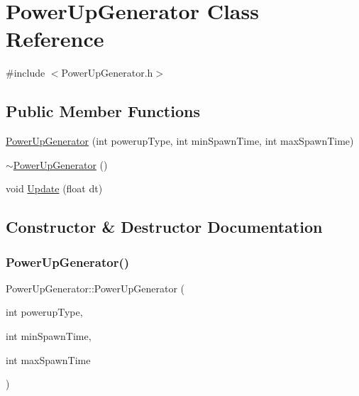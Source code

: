 \hypertarget{class_power_up_generator}{}\section{Power\+Up\+Generator Class Reference}
\label{class_power_up_generator}


{\ttfamily \#include $<$Power\+Up\+Generator.\+h$>$}

\subsection*{Public Member Functions}
\begin{DoxyCompactItemize}
\item 
\hyperlink{class_power_up_generator_af9e9b949330dd6ef6decc758f897454e}{Power\+Up\+Generator} (int powerup\+Type, int min\+Spawn\+Time, int max\+Spawn\+Time)
\item 
\hyperlink{class_power_up_generator_ae2cd842e45e73e0756b93a027ac03207}{$\sim$\+Power\+Up\+Generator} ()
\item 
void \hyperlink{class_power_up_generator_a49002c37923219a8289739b7432e187d}{Update} (float dt)
\end{DoxyCompactItemize}


\subsection{Constructor \& Destructor Documentation}
\hypertarget{class_power_up_generator_af9e9b949330dd6ef6decc758f897454e}{}\label{class_power_up_generator_af9e9b949330dd6ef6decc758f897454e} 
\subsubsection{\texorpdfstring{Power\+Up\+Generator()}{PowerUpGenerator()}}
{\footnotesize\ttfamily Power\+Up\+Generator\+::\+Power\+Up\+Generator (\begin{DoxyParamCaption}\item[{int}]{powerup\+Type,  }\item[{int}]{min\+Spawn\+Time,  }\item[{int}]{max\+Spawn\+Time }\end{DoxyParamCaption})}

\hypertarget{class_power_up_generator_ae2cd842e45e73e0756b93a027ac03207}{}\label{class_power_up_generator_ae2cd842e45e73e0756b93a027ac03207} 
